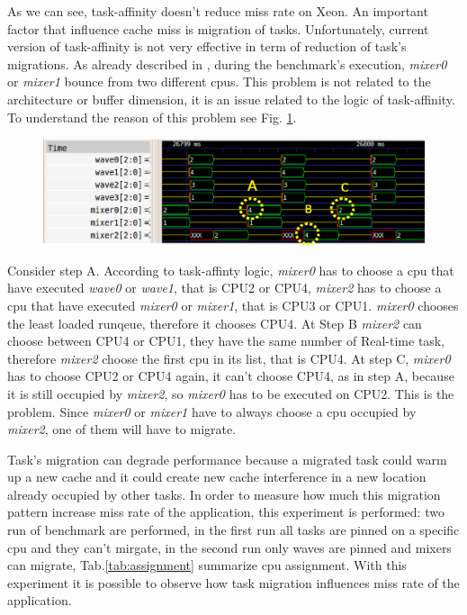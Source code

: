 As we can see, task-affinity doesn't reduce miss rate on Xeon. An important factor that influence cache miss is migration of tasks. Unfortunately, current 
version of task-affinity is not very effective in term of reduction of task's migrations. As already described in \cite{lcs}, during the benchmark's 
execution, \textit{mixer0} or \textit{mixer1} bounce from two different cpus. This problem is not related to the architecture or buffer dimension, it is 
an issue related to the logic of task-affinity. To understand the reason of this problem see Fig. \ref{fig:migr_pat}. 

\begin{figure}[htbp]
\centering
\includegraphics[width=\widefigure]{images/migr_i7.eps}
\caption{}
\label{fig:migr_pat}
\end{figure}

\newpage
Consider step A. According to task-affinty logic, \textit{mixer0} has to choose a cpu that have executed \textit{wave0} or \textit{wave1}, that is
CPU2 or CPU4, \textit{mixer2} has to choose a cpu that have executed \textit{mixer0} or \textit{mixer1}, that is CPU3 or CPU1. \textit{mixer0} chooses the 
least loaded runqeue, therefore it chooses CPU4. At Step B \textit{mixer2} can choose between CPU4 or CPU1, they have the same number of Real-time task, 
therefore \textit{mixer2} choose the first cpu in its list, that is CPU4. At step C, \textit{mixer0} has to choose CPU2 or CPU4 again, it can't choose CPU4,
as in step A, because it is still occupied by \textit{mixer2}, so \textit{mixer0} has to be executed on CPU2. This is the problem. Since \textit{mixer0} or 
\textit{mixer1} have to always choose a cpu occupied by \textit{mixer2}, one of them will have to migrate.

Task's migration can degrade performance because a migrated task could warm up a new cache and it could create new cache interference in a new location 
already occupied by other tasks. In order to measure how much this migration pattern increase miss rate of the application, this experiment is performed: 
two run of benchmark are performed, in the first run all tasks are pinned on a specific cpu and they can't mirgate, in the second run only waves are pinned
and mixers can migrate, Tab.\ref{tab:assignment} summarize cpu assignment. With this experiment it is possible to observe how task migration influences 
miss rate of the application.
\newpage


